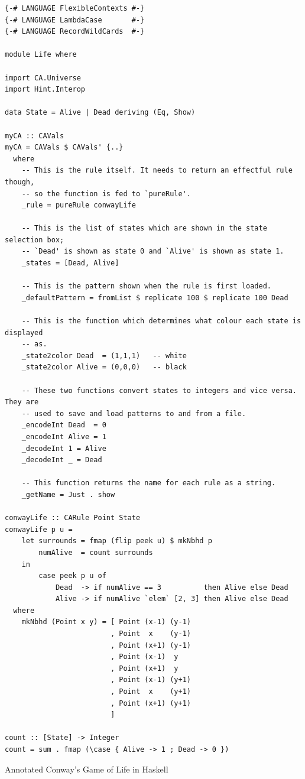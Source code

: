 \documentclass[oneside,a4paper]{memoir}
\newenvironment{longlisting}{\captionsetup{type=listing}}{}
\begin{document}
\begin{longlisting}
\begin{verbatim}
{-# LANGUAGE FlexibleContexts #-}
{-# LANGUAGE LambdaCase       #-}
{-# LANGUAGE RecordWildCards  #-}

module Life where

import CA.Universe
import Hint.Interop

data State = Alive | Dead deriving (Eq, Show)

myCA :: CAVals
myCA = CAVals $ CAVals' {..}
  where
    -- This is the rule itself. It needs to return an effectful rule though,
    -- so the function is fed to `pureRule'.
    _rule = pureRule conwayLife

    -- This is the list of states which are shown in the state selection box;
    -- `Dead' is shown as state 0 and `Alive' is shown as state 1.
    _states = [Dead, Alive]

    -- This is the pattern shown when the rule is first loaded.
    _defaultPattern = fromList $ replicate 100 $ replicate 100 Dead

    -- This is the function which determines what colour each state is displayed
    -- as.
    _state2color Dead  = (1,1,1)   -- white
    _state2color Alive = (0,0,0)   -- black

    -- These two functions convert states to integers and vice versa. They are
    -- used to save and load patterns to and from a file.
    _encodeInt Dead  = 0
    _encodeInt Alive = 1
    _decodeInt 1 = Alive
    _decodeInt _ = Dead

    -- This function returns the name for each rule as a string.
    _getName = Just . show

conwayLife :: CARule Point State
conwayLife p u =
    let surrounds = fmap (flip peek u) $ mkNbhd p
        numAlive  = count surrounds
    in
        case peek p u of
            Dead  -> if numAlive == 3          then Alive else Dead
            Alive -> if numAlive `elem` [2, 3] then Alive else Dead
  where
    mkNbhd (Point x y) = [ Point (x-1) (y-1)
                         , Point  x    (y-1)
                         , Point (x+1) (y-1)
                         , Point (x-1)  y
                         , Point (x+1)  y
                         , Point (x-1) (y+1)
                         , Point  x    (y+1)
                         , Point (x+1) (y+1)
                         ]

count :: [State] -> Integer
count = sum . fmap (\case { Alive -> 1 ; Dead -> 0 })
\end{verbatim}
\caption{Annotated Conway's Game of Life in Haskell}
\label{lst:agol}
\end{longlisting}
\end{document}
